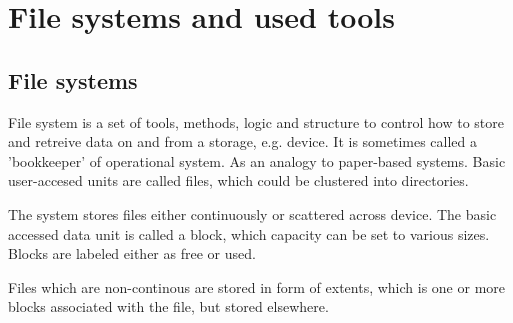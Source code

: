 \documentclass[
  color, %
  table, %
  lof,   %
  lot,   %
]{fithesis3}
\begin{document}





\chapter{File systems and used tools}
\section{File systems}
File system is a set of tools, methods, logic and structure to control how to store and retreive data on and from a storage, e.g. device. It is sometimes called a 'bookkeeper' of operational system. As an  analogy to paper-based systems. Basic user-accesed units are called files, which could be clustered into directories.

The system stores files either continuously or scattered across device. The basic accessed data unit is called a block, which capacity can be set to various sizes. Blocks are labeled either as free or used.

Files which are non-continous are stored in form of extents, which is one or more blocks associated with the file, but stored elsewhere.  
\end{document}
